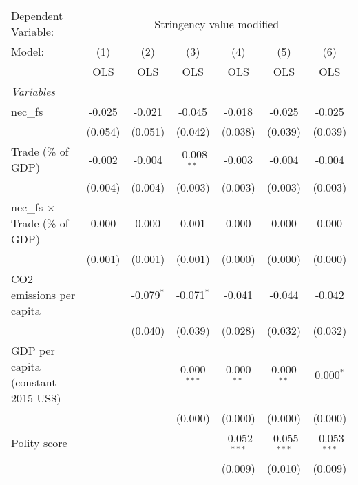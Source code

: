 
\begingroup
\centering
\begin{tabular}{lcccccc}
   \toprule
   Dependent Variable: & \multicolumn{6}{c}{Stringency value modified}\\
   Model:                                & (1)     & (2)          & (3)           & (4)            & (5)            & (6)\\  
                                         &  OLS    & OLS          & OLS           & OLS            & OLS            & OLS\\  
   \midrule
   \emph{Variables}\\
   nec\_fs                               & -0.025  & -0.021       & -0.045        & -0.018         & -0.025         & -0.025\\   
                                         & (0.054) & (0.051)      & (0.042)       & (0.038)        & (0.039)        & (0.039)\\   
   Trade (\% of GDP)                     & -0.002  & -0.004       & -0.008$^{**}$ & -0.003         & -0.004         & -0.004\\   
                                         & (0.004) & (0.004)      & (0.003)       & (0.003)        & (0.003)        & (0.003)\\   
   nec\_fs $\times$ Trade (\% of GDP)    & 0.000   & 0.000        & 0.001         & 0.000          & 0.000          & 0.000\\   
                                         & (0.001) & (0.001)      & (0.001)       & (0.000)        & (0.000)        & (0.000)\\   
   CO2 emissions per capita              &         & -0.079$^{*}$ & -0.071$^{*}$  & -0.041         & -0.044         & -0.042\\   
                                         &         & (0.040)      & (0.039)       & (0.028)        & (0.032)        & (0.032)\\   
   GDP per capita (constant 2015 US\$)   &         &              & 0.000$^{***}$ & 0.000$^{**}$   & 0.000$^{**}$   & 0.000$^{*}$\\   
                                         &         &              & (0.000)       & (0.000)        & (0.000)        & (0.000)\\   
   Polity score                          &         &              &               & -0.052$^{***}$ & -0.055$^{***}$ & -0.053$^{***}$\\   
                                         &         &              &               & (0.009)        & (0.010)        & (0.009)\\   

\end{tabular}
